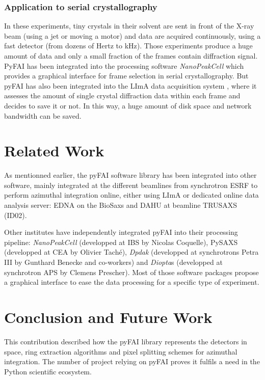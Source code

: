 \documentclass[preprint]{iucr}
\begin{document}
\subsubsection{Application to serial crystallography}
In these experiments, tiny crystals in their solvent are sent in
front of the X-ray beam (using a jet or moving a motor) and data are acquired
continuously, using a fast detector (from dozens of Hertz to kHz).
Those experiments produce a huge amount of data and only a small fraction of the
frames contain diffraction signal.
PyFAI has been integrated into the processing software \textit{NanoPeakCell}
which provides a graphical interface for frame selection in serial crystallography.
But pyFAI has also been integrated into the LImA data acquisition system
\cite{lima}, where it assesses the amount of single crystal
diffraction data within each frame and decides to save it or not.
In this way, a huge amount of disk space and network bandwidth
can be saved.

\section{Related Work}

As mentionned earlier, the pyFAI software library has been integrated
into other software, mainly integrated at the different beamlines from
synchrotron ESRF to perform azimuthal integration online, either using LImA or
dedicated online data analysis server: EDNA\cite{edna} on the BioSaxs\cite{bm29}
and DAHU at beamline TRUSAXS (ID02).

Other institutes have independently integrated pyFAI into their processing
pipeline: \textit{NanoPeakCell} (developped at IBS by Nicolas Coquelle), PySAXS
(developped at CEA by Olivier Taché), \textit{Dpdak} (developped at synchrotrons
Petra III by Gunthard Benecke and co-workers) \cite{dpdak}
and \textit{Diopta}s (developped at synchrotron APS by Clemens Prescher).
Most of those software packages propose a graphical interface to ease the
data processing for a specific type of experiment.

\section{Conclusion and Future Work}

This contribution described how the pyFAI library represents the detectors in
space, ring extraction algorithms and pixel splitting schemes for azimuthal
integration. The number of project relying on pyFAI proves it fulfils a need in
the Python scientific ecosystem.
\end{document}
